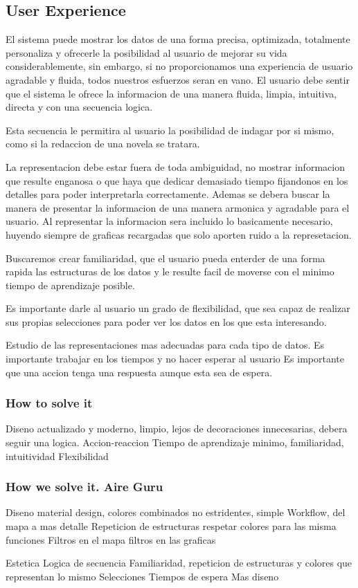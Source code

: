 \subsection{User Experience}
 El sistema puede mostrar los datos de una forma precisa, optimizada, totalmente personaliza y ofrecerle
 la posibilidad al usuario de mejorar su vida considerablemente, sin embargo, si no proporcionamos una experiencia
 de usuario agradable y fluida, todos nuestros esfuerzos seran en vano.
 El usuario debe sentir que el sistema le ofrece la informacion de una manera fluida, limpia, intuitiva, directa y con
 una secuencia logica.
  
Esta secuencia le permitira al usuario la posibilidad de indagar por si mismo, como si la redaccion de una novela se tratara.

La representacion debe estar fuera de toda ambiguidad, no mostrar informacion que resulte enganosa o que haya que dedicar demasiado tiempo fijandonos
en los detalles para poder interpretarla correctamente.
Ademas se debera buscar la manera de presentar la informacion de una manera armonica y agradable para el usuario.
Al representar la informacion sera incluido lo basicamente necesario, huyendo siempre de graficas recargadas que solo aporten ruido a la represetacion.

Buscaremos crear familiaridad, que el usuario pueda enterder de una forma rapida las estructuras de los datos y 
le resulte facil de moverse con el minimo tiempo de aprendizaje posible.

Es importante darle al usuario un grado de flexibilidad, que sea capaz de realizar sus propias selecciones para poder ver
los datos en los que esta interesando.

Estudio de las representaciones mas adecuadas para cada tipo de datos.
Es importante trabajar en los tiempos y no hacer esperar al usuario
Es importante que una accion tenga una respuesta aunque esta sea de espera.
    
\subsubsection{How to solve it} 
Diseno actualizado y moderno, limpio, lejos de decoraciones innecesarias, debera seguir una logica.
Accion-reaccion 
Tiempo de aprendizaje minimo, familiaridad, intuitividad
Flexibilidad

\subsubsection{How we solve it. Aire Guru} 
Diseno material design, colores combinados no estridentes, simple
Workflow, del mapa a mas detalle
Repeticion de estructuras
respetar colores para las misma funciones
Filtros en el mapa
filtros en las graficas
 
\begin{itemize}
    \done Estetica
    \done Logica de secuencia
    \done Familiaridad, repeticion de estructuras y colores que representan lo mismo
    \done Selecciones
    \crossed Tiempos de espera
    \crossed Mas diseno
    
\end{itemize}
\newpage